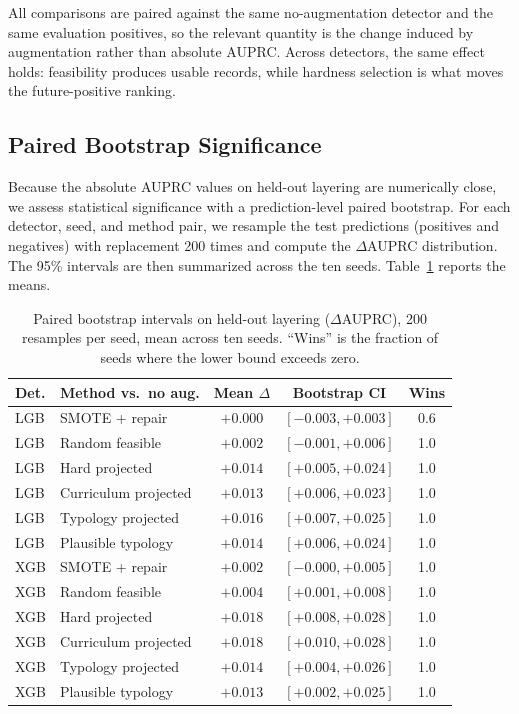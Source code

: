 \documentclass[sigconf,review,anonymous]{acmart}
\begin{document}
All comparisons are paired against the same no-augmentation detector and the
same evaluation positives, so the relevant quantity is the change induced by
augmentation rather than absolute AUPRC. Across detectors, the same effect
holds: feasibility produces usable records, while hardness selection is what
moves the future-positive ranking.

\subsection{Paired Bootstrap Significance}
\label{subsec:bootstrap}

Because the absolute AUPRC values on held-out layering are numerically close,
we assess statistical significance with a prediction-level paired bootstrap.
For each detector, seed, and method pair, we resample the test predictions
(positives and negatives) with replacement 200 times and compute the
$\Delta$AUPRC distribution. The 95\% intervals are then summarized across
the ten seeds. Table~\ref{tab:bootstrap} reports the means.

\begin{table}[t]
\centering
\caption{Paired bootstrap intervals on held-out layering ($\Delta$AUPRC),
200 resamples per seed, mean across ten seeds. ``Wins'' is the fraction of
seeds where the lower bound exceeds zero.}
\label{tab:bootstrap}
\setlength{\tabcolsep}{4pt}
\renewcommand{\arraystretch}{1.06}
\small
\begin{tabular}{@{}llccc@{}}
\toprule
\textbf{Det.} & \textbf{Method vs.\ no aug.} &
\textbf{Mean $\Delta$} & \textbf{Bootstrap CI} & \textbf{Wins} \\
\midrule
LGB & SMOTE + repair       & $+0.000$ & $[-0.003,+0.003]$ & 0.6 \\
LGB & Random feasible      & $+0.002$ & $[-0.001,+0.006]$ & 1.0 \\
LGB & Hard projected       & $+0.014$ & $[+0.005,+0.024]$ & 1.0 \\
LGB & Curriculum projected & $+0.013$ & $[+0.006,+0.023]$ & 1.0 \\
LGB & Typology projected   & $\mathbf{+0.016}$ & $[+0.007,+0.025]$ & 1.0 \\
LGB & Plausible typology   & $+0.014$ & $[+0.006,+0.024]$ & 1.0 \\
\midrule
XGB & SMOTE + repair       & $+0.002$ & $[-0.000,+0.005]$ & 1.0 \\
XGB & Random feasible      & $+0.004$ & $[+0.001,+0.008]$ & 1.0 \\
XGB & Hard projected       & $+0.018$ & $[+0.008,+0.028]$ & 1.0 \\
XGB & Curriculum projected & $\mathbf{+0.018}$ & $[+0.010,+0.028]$ & 1.0 \\
XGB & Typology projected   & $+0.014$ & $[+0.004,+0.026]$ & 1.0 \\
XGB & Plausible typology   & $+0.013$ & $[+0.002,+0.025]$ & 1.0 \\
\bottomrule
\end{tabular}
\end{table}
\end{document}
